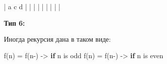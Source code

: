 \vspace{\baselineskip}
\begin{tcolorbox}

|\hspace{1mm} a \hspace{0,5mm} \hspace*{1,5mm} c \hspace*{0,5mm} d \hspace*{0,5mm}  |\newline
|\hspace*{1mm}  \hspace*{0,5mm}  \hspace*{1,5mm}\hspace*{1,6mm} \hspace*{2,2mm}   |\newline
|\hspace*{1mm}  \hspace*{0,5mm}  \hspace*{1,5mm} \hspace*{0,5mm} \hspace*{3,3mm}  |\newline
|\hspace*{1mm} \hspace*{1,7mm} \hspace*{1,5mm}  \hspace*{0,7mm}  \hspace*{0,6mm}   |\newline
|\hspace*{1mm} \hspace*{1,7mm} \hspace*{1,7mm}  \hspace*{0,5mm}  \hspace*{1,9mm}  |\newline

\end{tcolorbox}
\vspace{\baselineskip}
\textbf{Тип 6:}

\vspace{\baselineskip}
Иногда рекурсия дана в таком виде:

\vspace{\baselineskip}
\begin{tcolorbox}

f(n) = f(n-)\hspace{3mm}   -> \textbf{if} n is odd\newline
f(n) = f(n-)\hspace*{3mm}   -> \textbf{if} n is even
\end{tcolorbox}

